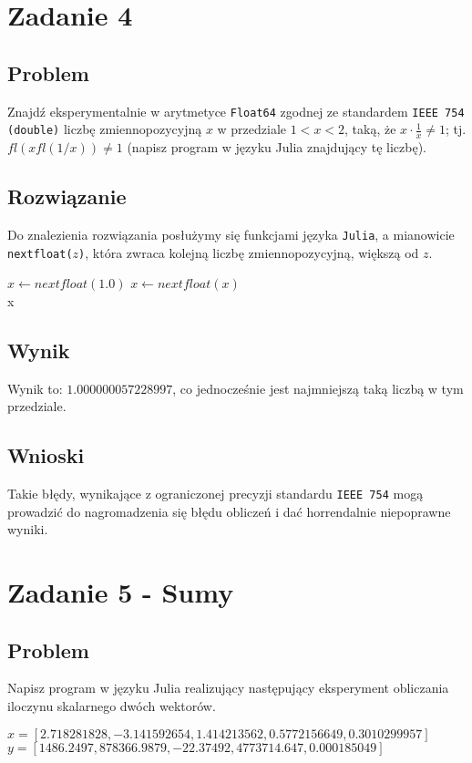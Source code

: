 \documentclass{article}
\begin{document}
    \section{Zadanie 4}
        \subsection{Problem}
            Znajdź eksperymentalnie w arytmetyce \texttt{Float64} zgodnej ze standardem \texttt{IEEE 754 (double)} liczbę zmiennopozycyjną $x$ w przedziale $1 < x < 2$, taką, że $x\cdot\frac{1}{x}\neq1$; tj.
            $fl(xfl(1/x))\neq1$ (napisz program w języku Julia znajdujący tę liczbę).
        \subsection{Rozwiązanie}
            Do znalezienia rozwiązania posłużymy się funkcjami języka \texttt{Julia}, a mianowicie \texttt{nextfloat($z$)}, która zwraca kolejną liczbę zmiennopozycyjną, większą od $z$.
            \begin{algorithm}
                \begin{algorithmic}[1]
                \State $x\gets nextfloat(1.0)$
                    \State $x\gets nextfloat(x)$
                \EndWhile \\
                \Return x
                \end{algorithmic}
            \end{algorithm}
        \subsection{Wynik}
            Wynik to: $1.000000057228997$, co jednocześnie jest najmniejszą taką liczbą w tym przedziale.
        \subsection{Wnioski}
            Takie błędy, wynikające z ograniczonej precyzji standardu \texttt{IEEE 754} mogą prowadzić do nagromadzenia się błędu obliczeń i dać horrendalnie niepoprawne wyniki.
        
    \section{Zadanie 5 - Sumy}
        \subsection{Problem}
            Napisz program w języku Julia realizujący następujący eksperyment obliczania iloczynu skalarnego dwóch wektorów.
            \begin{center}
               $x = [2.718281828, -3.141592654, 1.414213562, 0.5772156649, 0.3010299957]$ \\
                $y = [1486.2497, 878366.9879, -22.37492, 4773714.647, 0.000185049]$
            \end{center}
\end{document}
